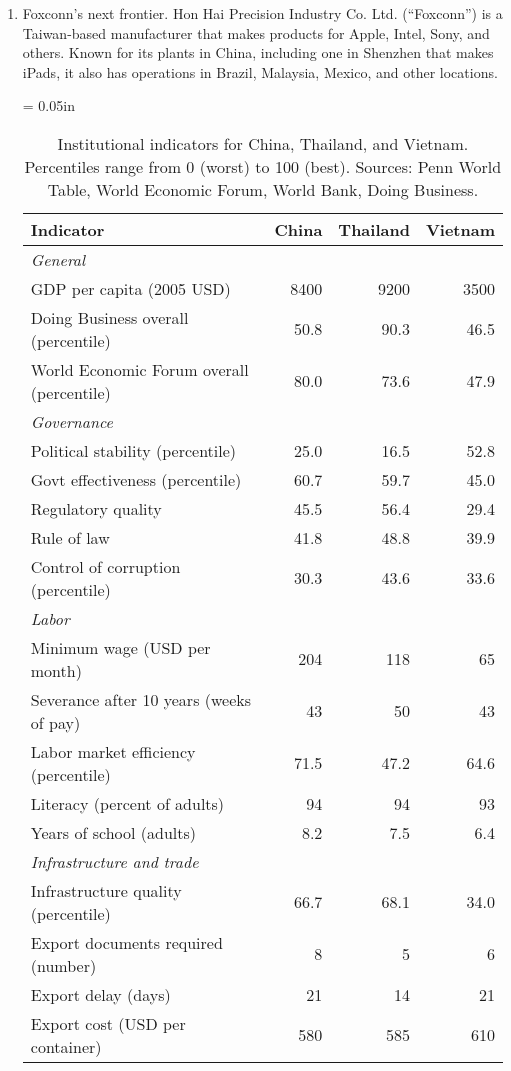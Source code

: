 \setlength{\leftmargini}{.5\oldleftmargini}
\begin{enumerate}
\item Foxconn's next frontier. 
Hon Hai Precision Industry Co. Ltd. (``Foxconn'') is a Taiwan-based manufacturer that makes
products for Apple, Intel, Sony, and others.
Known for its plants in China, including one in Shenzhen that makes iPads,
it also has operations in Brazil, Malaysia, Mexico, and other locations.


\begin{table}[h]
\centering
\tabcolsep = 0.05in
\begin{tabular}{lrrr}
\toprule
Indicator & China & Thailand & Vietnam \\
\midrule
\multicolumn{2}{l}{\it General} \\
GDP per capita  (2005 USD) &  8400 & 9200 & 3500  \\
Doing Business overall (percentile) & 50.8  &90.3 & 46.5 \\
World Economic Forum overall (percentile) & 80.0 & 73.6 & 47.9\\
\midrule
\multicolumn{2}{l}{\it Governance} \\
Political stability (percentile)  &  25.0 & 16.5 & 52.8 \\
Govt effectiveness (percentile)   &  60.7 & 59.7 & 45.0 \\
Regulatory quality                & 45.5  & 56.4 & 29.4\\
Rule of law                       & 41.8 & 48.8 & 39.9 \\
Control of corruption (percentile) & 30.3 & 43.6 & 33.6  \\
\midrule
\multicolumn{2}{l}{\it Labor} \\
Minimum wage (USD per month) &  204 & 118 & 65 \\
Severance after 10 years (weeks of pay) & 43 & 50 & 43 \\
Labor market efficiency (percentile) & 71.5 & 47.2 & 64.6 \\
Literacy (percent of adults)        & 94 & 94 & 93 \\
Years of school (adults)        & 8.2 & 7.5 & 6.4 \\
\midrule
\multicolumn{2}{l}{\it Infrastructure and trade} \\
Infrastructure quality (percentile)  & 66.7 & 68.1 & 34.0 \\
Export documents required (number) & 8 & 5 & 6\\
Export delay (days) &  21 & 14 & 21  \\
Export cost (USD per container) &  580 & 585 & 610 \\
\bottomrule
\end{tabular}
\caption{Institutional indicators for China, Thailand, and Vietnam.
Percentiles range from 0 (worst) to 100 (best).
Sources:  Penn World Table, World Economic Forum, World Bank, Doing Business.}
\label{tab:ctv}
\end{table}


\end{enumerate}
